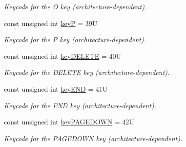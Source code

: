 \begin{DoxyCompactItemize}
\begin{DoxyCompactList}\small\item\em Keycode for the {\ttfamily O} key (architecture-\/dependent). \end{DoxyCompactList}\item 
\mbox{\label{namespacecimg__library__suffixed_1_1cimg_a1f2ce832fb4b7b56e09844c7a5b2e700}} 
const unsigned int \hyperlink{namespacecimg__library__suffixed_1_1cimg_a1f2ce832fb4b7b56e09844c7a5b2e700}{keyP} = 39U
\begin{DoxyCompactList}\small\item\em Keycode for the {\ttfamily P} key (architecture-\/dependent). \end{DoxyCompactList}\item 
\mbox{\label{namespacecimg__library__suffixed_1_1cimg_a4a2d57d28434ade9115535b8c22e1fc7}} 
const unsigned int \hyperlink{namespacecimg__library__suffixed_1_1cimg_a4a2d57d28434ade9115535b8c22e1fc7}{key\+D\+E\+L\+E\+TE} = 40U
\begin{DoxyCompactList}\small\item\em Keycode for the {\ttfamily D\+E\+L\+E\+TE} key (architecture-\/dependent). \end{DoxyCompactList}\item 
\mbox{\label{namespacecimg__library__suffixed_1_1cimg_acc2a9f2b1e170ad0b7fc80f775cdd087}} 
const unsigned int \hyperlink{namespacecimg__library__suffixed_1_1cimg_acc2a9f2b1e170ad0b7fc80f775cdd087}{key\+E\+ND} = 41U
\begin{DoxyCompactList}\small\item\em Keycode for the {\ttfamily E\+ND} key (architecture-\/dependent). \end{DoxyCompactList}\item 
\mbox{\label{namespacecimg__library__suffixed_1_1cimg_a5087d21815dba73fa2327efbe9e44cbd}} 
const unsigned int \hyperlink{namespacecimg__library__suffixed_1_1cimg_a5087d21815dba73fa2327efbe9e44cbd}{key\+P\+A\+G\+E\+D\+O\+WN} = 42U
\begin{DoxyCompactList}\small\item\em Keycode for the {\ttfamily P\+A\+G\+E\+D\+O\+WN} key (architecture-\/dependent). \end{DoxyCompactList}\item 

\end{DoxyCompactItemize}
